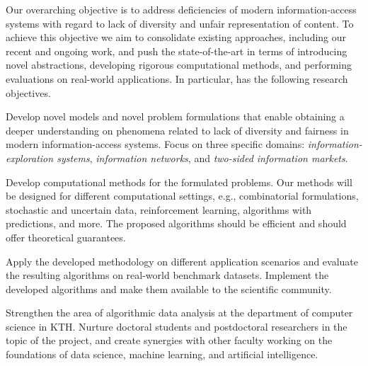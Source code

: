 \documentclass[a4paper,11pt]{article}
\begin{document}
Our overarching objective is to address deficiencies of modern information-access systems 
with regard to lack of diversity and unfair representation of content.
To achieve this objective we aim to consolidate existing approaches, 
including our recent and ongoing work,  
and push the state-of-the-art 
in terms of introducing novel abstractions, 
developing rigorous computational methods, and 
performing evaluations on real-world applications.
In particular, {\acronym} has the following research objectives. 
%
\begin{description}
\setlength{\itemsep}{-4pt}
\item[{Models and problems:}]
Develop novel models and novel problem formulations that enable 
obtaining a deeper understanding on phenomena related 
to lack of diversity and fairness in  modern information-access systems.
Focus on three specific domains: 
\emph{information-exploration systems}, \emph{information networks}, and 
\emph{two-sided information markets}.

\item[{Algorithms:}]
Develop computational methods for the formulated problems.
Our methods will be designed for different computational settings, 
e.g., combinatorial formulations, stochastic and uncertain data, 
reinforcement learning, algorithms with predictions, and more.
The proposed algorithms should be efficient %
and should offer theoretical guarantees.


\item[{Applications:}]
Apply the developed methodology on different application scenarios 
and evaluate the resulting algorithms on real-world benchmark datasets.
Implement the developed algorithms and make them available to the scientific community.

\item[{Research environment in KTH:}]
Strengthen the area of algorithmic data analysis 
at the department of computer science in KTH. 
Nurture doctoral students and postdoctoral researchers in the topic of the project,
and create synergies with other faculty working on 
the foundations of data science, machine learning, and artificial intelligence.
\end{description}
\end{document}
